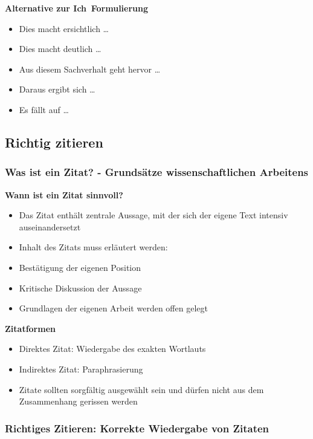 \textbf{Alternative zur \frqq Ich\flqq\, Formulierung}

\begin{itemize}%
\item
  Dies macht ersichtlich \ldots{}
\item
  Dies macht deutlich \ldots{}
\item
  Aus diesem Sachverhalt geht hervor \ldots{}
\item
  Daraus ergibt sich \ldots{}
\item
  Es fällt auf \ldots{}
\end{itemize}

\subsection{Richtig zitieren}\label{richtig-zitieren}

\subsubsection{Was ist ein Zitat? - Grundsätze wissenschaftlichen
Arbeitens}\label{was-ist-ein-zitat-grundsaetze-wissenschaftlichen-arbeitens}

\textbf{Wann ist ein Zitat sinnvoll?}

\begin{itemize}%
\item
  Das Zitat enthält zentrale Aussage, mit der sich der eigene Text
  intensiv auseinandersetzt
\item
  Inhalt des Zitats muss erläutert werden:
\item
  Bestätigung der eigenen Position
\item
  Kritische Diskussion der Aussage
\item
  Grundlagen der eigenen Arbeit werden offen gelegt
\end{itemize}

\textbf{Zitatformen}

\begin{itemize}%
\item
  Direktes Zitat: Wiedergabe des exakten Wortlauts
\item
  Indirektes Zitat: Paraphrasierung
\item
  Zitate sollten sorgfältig ausgewählt sein und dürfen nicht aus dem
  Zusammenhang gerissen werden
\end{itemize}

\subsubsection{Richtiges Zitieren: Korrekte Wiedergabe von
Zitaten}\label{richtiges-zitieren-korrekte-wiedergabe-von-zitaten}

